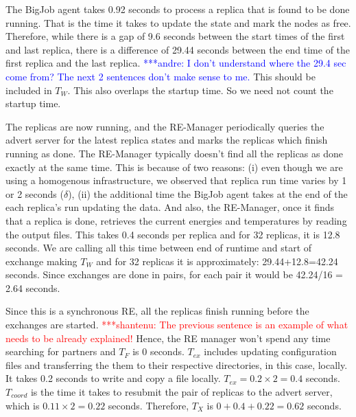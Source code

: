 \documentclass{rspublic}
\newcommand{\jhanote}[1]{ {\textcolor{red} { ***shantenu: #1 }}}
\newcommand{\alnote}[1]{ {\textcolor{blue} { ***andre: #1 }}}
\newcommand{\alnote}[1]{}
\newcommand{\jhanote}[1]{}
\begin{document}
The BigJob agent takes 0.92 seconds to process a replica that is 
found to be done running. That is the time it takes to update the 
state and mark the nodes as free. Therefore, while there is a gap of 
9.6 seconds between the
start times of the first and last replica, there is a difference of
29.44 seconds between the end time of the first replica and the last
replica. \alnote{I don't understand where the 29.4 sec come from? The next
2 sentences don't make sense to me.} 
This should be included in $T_W$. This also overlaps the
startup time. So we need not count the startup time.

The replicas are now running, and the RE-Manager periodically queries
the advert server for the latest replica states and marks the replicas
which finish running as done. The RE-Manager typically doesn't find
all the replicas as done exactly at the same time. This is because of
two reasons: (i) even though we are using a homogenous infrastructure,
we observed that replica run time varies by 1 or 2 seconds ($\delta$),
(ii) the additional time the BigJob agent takes at the end of the each
replica's run updating the data. And also, the RE-Manager, once it
finds that a replica is done, retrieves the current energies and
temperatures by reading the output files. This takes 0.4 seconds per
replica and for 32 replicas, it is 12.8 seconds.  We are calling all
this time between end of runtime and start of exchange making $T_W$
and for 32 replicas it is approximately: 29.44+12.8=42.24
seconds. Since exchanges are done in pairs, for each pair it would be
42.24/16 = 2.64 seconds.

Since this is a synchronous RE, all the replicas finish running before
the exchanges are started. \jhanote{The previous sentence is an
  example of what needs to be already explained!}  Hence, the RE
manager won't spend any time searching for partners and $T_F$ is 0
seconds. $T_{ex}$ includes updating configuration files and
transferring the them to their respective directories, in this case,
locally. It takes 0.2 seconds to write and copy a file
locally. $T_{ex} = 0.2 \times 2=0.4$ seconds. $T_{coord}$ is the time
it takes to resubmit the pair of replicas to the advert server, which
is $0.11\times 2 = 0.22$ seconds. Therefore, $T_X$ is
$0+0.4+0.22=0.62$ seconds. 
\end{document}
